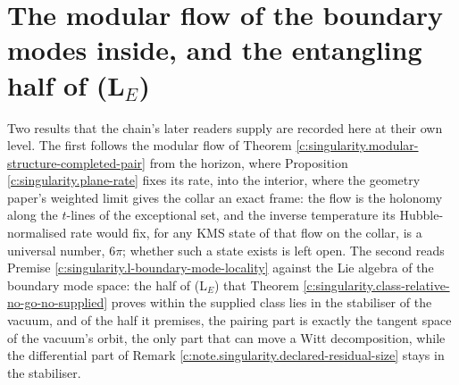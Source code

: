 \documentclass[11pt]{article}
\theoremstyle{definition}
\theoremstyle{plain}
\begin{document}
\section{The modular flow of the boundary modes inside, and the entangling half of (L$_E$)}

\label{c:note.singularity.setting-modular-flow-boundary-modes-inside}
Two results that the chain's later readers supply are recorded here at their own level. The first follows the modular flow of Theorem \ref{c:singularity.modular-structure-completed-pair} from the horizon, where Proposition \ref{c:singularity.plane-rate} fixes its rate, into the interior, where the geometry paper's weighted limit gives the collar an exact frame: the flow is the holonomy along the $t$-lines of the exceptional set, and the inverse temperature its Hubble-normalised rate would fix, for any KMS state of that flow on the collar, is a universal number, $6\pi$; whether such a state exists is left open. The second reads Premise \ref{c:singularity.l-boundary-mode-locality} against the Lie algebra of the boundary mode space: the half of (L$_E$) that Theorem \ref{c:singularity.class-relative-no-go-no-supplied} proves within the supplied class lies in the stabiliser of the vacuum, and of the half it premises, the pairing part is exactly the tangent space of the vacuum's orbit, the only part that can move a Witt decomposition, while the differential part of Remark \ref{c:note.singularity.declared-residual-size} stays in the stabiliser.
\end{document}
